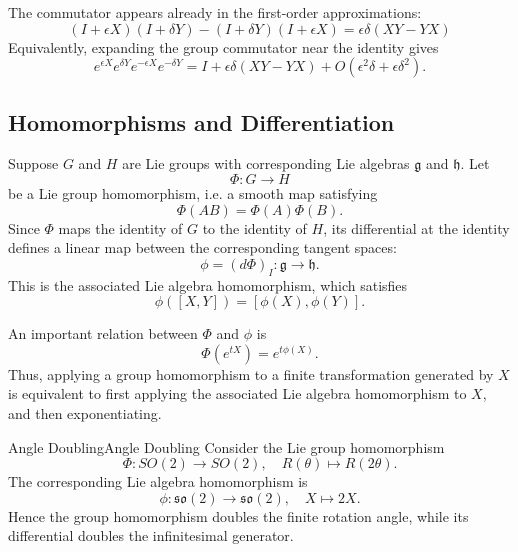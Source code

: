 \documentclass[../main.tex]{subfiles}
\begin{document}
The commutator appears already in the first-order approximations:
\begin{equation*}
  (I + \epsilon X)(I + \delta Y) - (I + \delta Y)(I + \epsilon X) = \epsilon\delta(XY - YX)
\end{equation*}
Equivalently, expanding the group commutator near the identity gives
\begin{equation*}
  e^{\epsilon X} e^{\delta Y} e^{-\epsilon X} e^{-\delta Y} = I + \epsilon\delta(XY - YX) + O(\epsilon^2 \delta + \epsilon \delta^2).
\end{equation*}

\subsection{Homomorphisms and Differentiation}

Suppose $G$ and $H$ are Lie groups with corresponding Lie algebras $\mathfrak{g}$ and $\mathfrak{h}$. Let
\begin{equation}
  \Phi:G\to H
\end{equation}
be a Lie group homomorphism, i.e. a smooth map satisfying
\begin{equation}
  \Phi(AB)=\Phi(A)\Phi(B).
\end{equation}
Since $\Phi$ maps the identity of $G$ to the identity of $H$, its differential at the identity defines a linear map between the corresponding tangent spaces:
\begin{equation}
  \phi=(d\Phi)_I:\mathfrak{g}\to\mathfrak{h}.
\end{equation}
This is the associated Lie algebra homomorphism, which satisfies
\begin{equation}
  \phi([X,Y])=[\phi(X),\phi(Y)].
\end{equation}

An important relation between $\Phi$ and $\phi$ is
\begin{equation}
  \Phi(e^{tX})=e^{t\phi(X)}.
\end{equation}
Thus, applying a group homomorphism to a finite transformation generated by $X$ is equivalent to first applying the associated Lie algebra homomorphism to $X$, and then exponentiating.

\begin{example}{Angle Doubling}{Angle Doubling}
  Consider the Lie group homomorphism
  \begin{equation}
    \Phi:SO(2)\to SO(2),\quad
    R(\theta)\mapsto R(2\theta).
  \end{equation}
  The corresponding Lie algebra homomorphism is
  \begin{equation}
    \phi:\mathfrak{so}(2)\to\mathfrak{so}(2),
    \quad X\mapsto 2X.
  \end{equation}
  Hence the group homomorphism doubles the finite rotation angle, while its differential doubles the infinitesimal generator.
\end{example}
\end{document}
